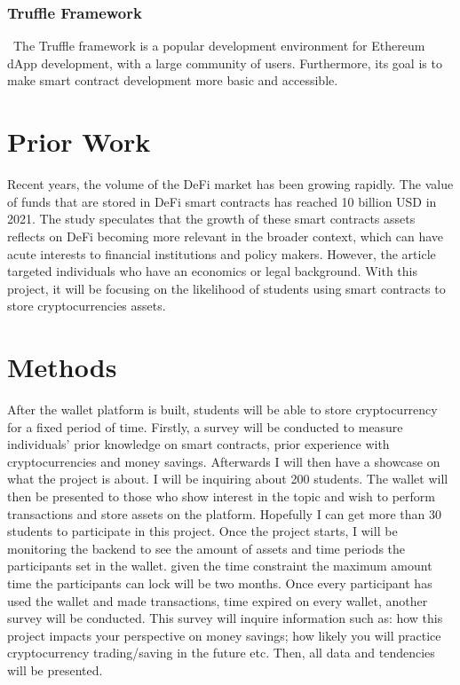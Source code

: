 \documentclass[10pt,twocolumn]{article}
\begin{document}
\subsubsection{Truffle Framework}\
The Truffle framework is a popular development environment for Ethereum dApp development, with a large community of users. Furthermore, its goal is to make smart contract development more basic and accessible.

\section{Prior Work}

Recent years, the volume of the DeFi market has been growing rapidly. The value of funds that are stored in DeFi smart contracts has reached 10 billion USD in 2021. The study speculates that the growth of these smart contracts assets reflects on DeFi becoming more relevant in the broader context, which can have acute interests to financial institutions and policy makers. However, the article targeted individuals who have an economics or legal background. With this project, it will be focusing on the likelihood of students using smart contracts to store cryptocurrencies assets. 


\section{Methods}

After the wallet platform is built, students will be able to store cryptocurrency for a fixed period of time. Firstly, a survey will be conducted to measure individuals’ prior knowledge on smart contracts, prior experience with cryptocurrencies and money savings. Afterwards I will then have a showcase on what the project is about. I will be inquiring about 200 students. The wallet will then be presented to those who show interest in the topic and wish to perform transactions and store assets on the platform. Hopefully I can get more than 30 students to participate in this project.
	Once the project starts, I will be monitoring the backend to see the amount of assets and time periods the participants set in the wallet. given the time constraint the maximum amount time the participants can lock will be two months.
	Once every participant has used the wallet and made transactions, time expired on every wallet, another survey will be conducted. This survey will inquire information such as: how this project impacts your perspective on money savings; how likely you will practice cryptocurrency trading/saving in the future etc.
	Then, all data and tendencies will be presented.
\end{document}
